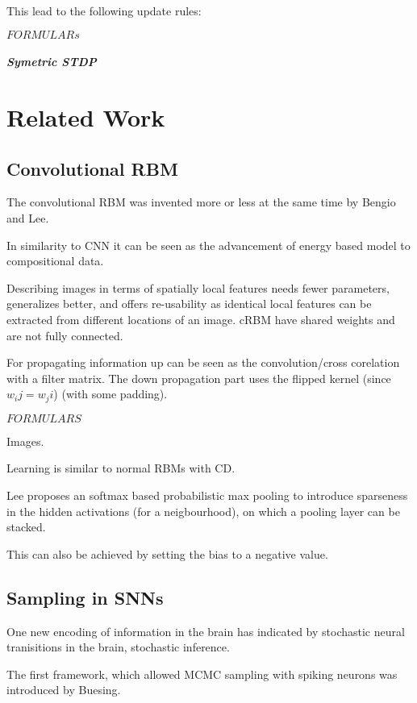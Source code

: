 This lead to the following update rules:

$FORMULARs$

     

\paragraph{Symetric STDP}



\chapter{Related Work}
\section{Convolutional RBM}

The convolutional RBM was invented more or less at the same time by Bengio and Lee. 

In similarity to CNN it can be seen as the advancement of energy based model to compositional data.

Describing images in terms of spatially local features needs fewer parameters, generalizes better, and offers re-usability as identical local features can be extracted from different locations of an image.
cRBM have shared weights and are not fully connected.


For propagating information up can be seen as the convolution/cross corelation with a filter matrix. 
The down propagation part uses the flipped kernel (since $w_ij = w_ji$) (with some padding).

$FORMULARS$

Images.

Learning is similar to normal RBMs with CD.

Lee proposes an softmax based probabilistic max pooling to introduce sparseness in the hidden activations (for a neigbourhood), on which a pooling layer can be stacked.

This can also be achieved by setting the bias to a negative value. 

\section{Sampling in SNNs}

One new encoding of information in the brain has indicated by stochastic neural tranisitions in the brain, stochastic inference. 

The first framework, which allowed MCMC sampling with spiking neurons was introduced by Buesing.

